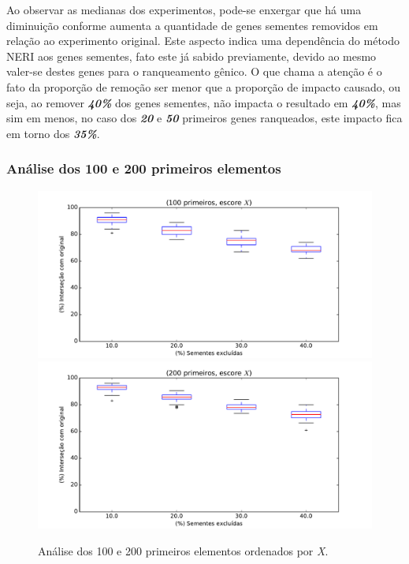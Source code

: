 Ao observar as medianas dos experimentos, pode-se enxergar que há uma diminuição conforme aumenta a quantidade de genes sementes removidos em relação ao experimento original. Este aspecto indica uma dependência do método NERI aos genes sementes, fato este já sabido previamente, devido ao mesmo valer-se destes genes para o ranqueamento gênico. O que chama a atenção é o fato da proporção de remoção ser menor que a proporção de impacto causado, ou seja, ao remover \textsl{\textbf{40\%}} dos genes sementes, não impacta o resultado em \textsl{\textbf{40\%}}, mas sim em menos, no caso dos \textsl{\textbf{20}} e \textsl{\textbf{50}} primeiros genes ranqueados, este impacto fica em torno dos \textsl{\textbf{35\%}}.



%
\subsubsection{Análise dos 100 e 200 primeiros elementos}
%
\begin{figure}[ht!]
\includegraphics[width=1\textwidth]{Images/analyses/fig_X_100_40.pdf}
\includegraphics[width=1\textwidth]{Images/analyses/fig_X_200_40.pdf}
\caption {Análise dos 100 e 200 primeiros elementos ordenados por \textit{X}.
\label{fig_X_100-200_40}}
\end{figure}
%

